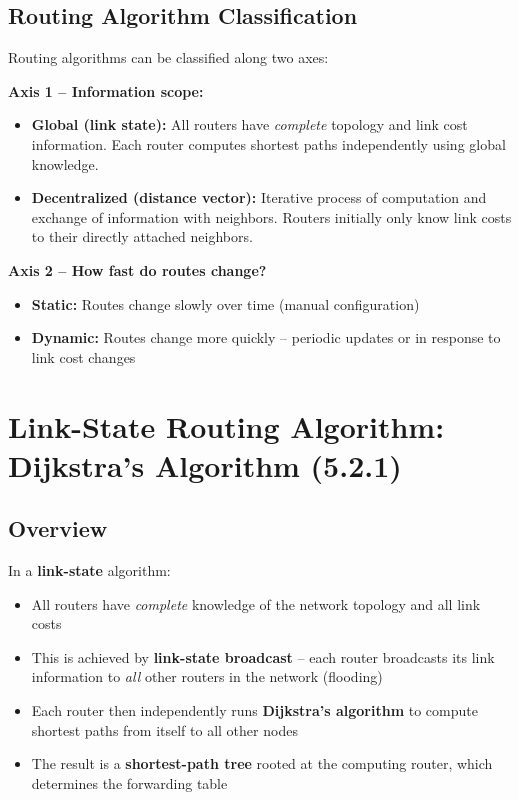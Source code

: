 \subsection{Routing Algorithm Classification}

\begin{exambox}
Routing algorithms can be classified along two axes:

\textbf{Axis 1 -- Information scope:}
\begin{itemize}[noitemsep]
    \item \textbf{Global (link state):} All routers have \emph{complete} topology and link cost information. Each router computes shortest paths independently using global knowledge.
    \item \textbf{Decentralized (distance vector):} Iterative process of computation and exchange of information with neighbors. Routers initially only know link costs to their directly attached neighbors.
\end{itemize}

\textbf{Axis 2 -- How fast do routes change?}
\begin{itemize}[noitemsep]
    \item \textbf{Static:} Routes change slowly over time (manual configuration)
    \item \textbf{Dynamic:} Routes change more quickly -- periodic updates or in response to link cost changes
\end{itemize}
\end{exambox}

\section{Link-State Routing Algorithm: Dijkstra's Algorithm (5.2.1)}

\subsection{Overview}

\begin{keybox}
In a \textbf{link-state} algorithm:
\begin{itemize}[noitemsep]
    \item All routers have \emph{complete} knowledge of the network topology and all link costs
    \item This is achieved by \textbf{link-state broadcast} -- each router broadcasts its link information to \emph{all} other routers in the network (flooding)
    \item Each router then independently runs \textbf{Dijkstra's algorithm} to compute shortest paths from itself to all other nodes
    \item The result is a \textbf{shortest-path tree} rooted at the computing router, which determines the forwarding table
\end{itemize}
\end{keybox}


